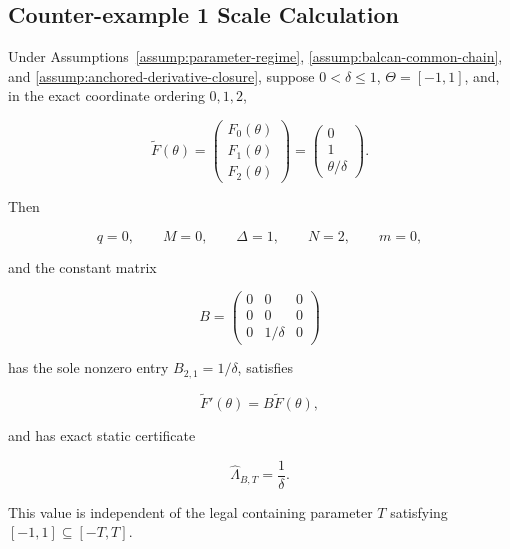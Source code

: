 \subsection{Counter-example 1 Scale Calculation}\label{app:step-011}

\begin{lemma}
\label{lem:step-011-shear-certificate}

Under Assumptions~\ref{assump:parameter-regime}, \ref{assump:balcan-common-chain}, and
\ref{assump:anchored-derivative-closure}, suppose \(0<\delta\leq1\), \(\Theta=[-1,1]\), and, in the exact
coordinate ordering \(0,1,2\),

\begin{equation}
\label{eq:appendix-display-336}
\widetilde F(\theta)
=
\begin{pmatrix}
F_0(\theta)\\ F_1(\theta)\\ F_2(\theta)
\end{pmatrix}
=
\begin{pmatrix}
0\\ 1\\ \theta/\delta
\end{pmatrix}.
\end{equation}

Then

\begin{equation}
\label{eq:appendix-display-337}
q=0,\qquad M=0,\qquad \Delta=1,\qquad N=2,\qquad m=0,
\end{equation}

and the constant matrix

\begin{equation}
\label{eq:appendix-display-338}
B
=
\begin{pmatrix}
0&0&0\\
0&0&0\\
0&1/\delta&0
\end{pmatrix}
\end{equation}

has the sole nonzero entry \(B_{2,1}=1/\delta\), satisfies

\begin{equation}
\label{eq:appendix-display-339}
\widetilde F'(\theta)=B\widetilde F(\theta),
\end{equation}

and has exact static certificate

\begin{equation}
\label{eq:appendix-display-340}
\widehat\Lambda_{B,T}=\frac1\delta.
\end{equation}

This value is independent of the legal containing parameter \(T\) satisfying
\([-1,1]\subseteq[-T,T]\).


\end{lemma}

